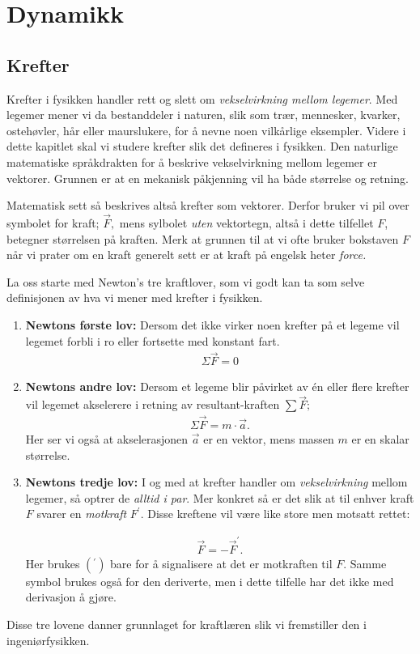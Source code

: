 \chapter{Dynamikk}


\newpage
\section{Krefter}
Krefter i fysikken handler rett og slett om \textit{vekselvirkning mellom legemer}. Med legemer mener vi da bestanddeler i naturen, slik som trær, mennesker, kvarker, ostehøvler, hår eller maurslukere, for å nevne noen vilkårlige eksempler. Videre i dette kapitlet skal vi studere krefter slik det defineres i fysikken. Den naturlige matematiske språkdrakten for å beskrive vekselvirkning mellom legemer er vektorer. Grunnen er at en mekanisk påkjenning vil ha både størrelse og retning.

Matematisk sett så beskrives altså krefter som vektorer. Derfor bruker vi pil over symbolet for kraft; $\vec{F},$ mens sylbolet \textit{uten} vektortegn, altså i dette tilfellet $F$, betegner størrelsen på kraften. Merk at grunnen til at vi ofte bruker bokstaven $F$ når vi prater om en kraft generelt sett er at kraft på engelsk heter \textit{force.}

La oss starte med Newton's tre kraftlover, som vi godt kan ta som selve definisjonen av hva vi mener med krefter i fysikken.
\begin{enumerate}
\item \textbf{Newtons første lov:} Dersom det ikke virker noen krefter på et legeme vil legemet forbli i ro eller fortsette med konstant fart.
\begin{align}
\Sigma\vec{F} = 0
\end{align}
\item \textbf{Newtons andre lov:} Dersom et legeme blir påvirket av én eller flere krefter vil legemet akselerere i retning av  resultant-kraften $\sum\vec{F};$
\begin{align}
\Sigma\vec{F} = m \cdot\vec{a}.
\end{align}
Her ser vi også at akselerasjonen $\vec{a}$ er en vektor, mens massen $m$ er en skalar størrelse.
\item \textbf{Newtons tredje lov:} I og med at krefter handler om \textit{vekselvirkning} mellom legemer, så optrer de \textit{alltid i par}. Mer konkret så er det slik at til enhver kraft $F$ svarer en \textit{motkraft} $F^\prime$. Disse kreftene vil være like store men motsatt rettet:

\begin{align}
\vec{F}=-\vec{F}^\prime.
\end{align}
Her brukes $(^\prime)$ bare for å signalisere at det er motkraften til $F$. Samme symbol brukes også for den deriverte, men i dette tilfelle har det ikke med derivasjon å gjøre.
\end{enumerate}
Disse tre lovene danner grunnlaget for kraftlæren slik vi fremstiller den i ingeniørfysikken.

